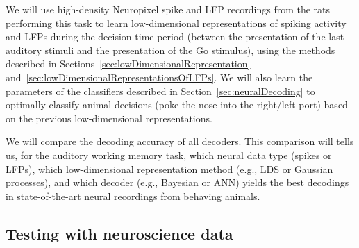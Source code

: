 We will use high-density Neuropixel spike and LFP recordings from the rats
performing this task to learn low-dimensional representations of spiking
activity and LFPs during the decision time period (between the presentation of
the last auditory stimuli and the presentation of the Go stimulus), using the
methods described in
Sections~\ref{sec:lowDimensionalRepresentation}
and~\ref{sec:lowDimensionalRepresentationsOfLFPs}. We will also learn the
parameters of the classifiers described in Section~\ref{sec:neuralDecoding} to
optimally classify animal decisions (poke the nose into the right/left port)
based on the previous low-dimensional representations.

We will compare the decoding accuracy of all decoders. This comparison will
tells us, for the auditory working memory task, which neural data type (spikes
or LFPs), which low-dimensional representation method (e.g., LDS or Gaussian
processes), and which decoder (e.g., Bayesian or ANN) yields the best decodings
in state-of-the-art neural recordings from behaving animals.

\subsection{Testing with neuroscience data}
\label{sec:testingWithNeuroscienceData}

